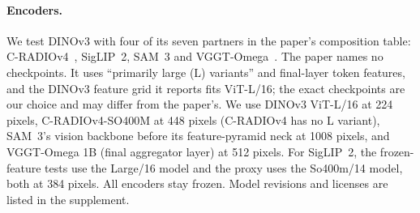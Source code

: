 \paragraph{Encoders.}
We test DINOv3 with four of its seven partners in the paper's composition table: C-RADIOv4~\cite{ranzinger2026cradiov4}, SigLIP~2, SAM~3 and VGGT-Omega~.
The paper names no checkpoints. It uses ``primarily large (L) variants'' and final-layer token features, and the DINOv3 feature grid it reports fits ViT-L/16; the exact checkpoints are our choice and may differ from the paper's.
We use DINOv3 ViT-L/16 at 224 pixels, C-RADIOv4-SO400M at 448 pixels (C-RADIOv4 has no L variant), SAM~3's vision backbone before its feature-pyramid neck at 1008 pixels, and VGGT-Omega 1B (final aggregator layer) at 512 pixels.
For SigLIP~2, the frozen-feature tests use the Large/16 model and the proxy uses the So400m/14 model, both at 384 pixels.
All encoders stay frozen. Model revisions and licenses are listed in the supplement.

